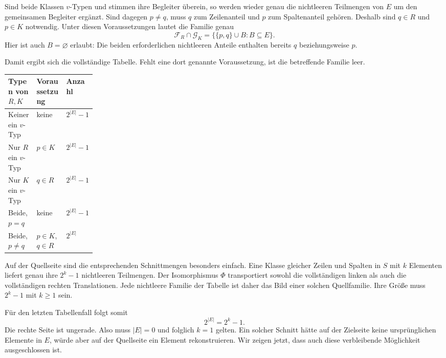 \documentclass[a4paper,11pt]{article}
\theoremstyle{remark}
\begin{document}
Sind beide Klassen $v$-Typen und stimmen ihre Begleiter überein, so
werden wieder genau die nichtleeren Teilmengen von $E$ um den gemeinsamen
Begleiter ergänzt. Sind dagegen $p\ne q$, muss $q$ zum Zeilenanteil und
$p$ zum Spaltenanteil gehören. Deshalb sind $q\in R$ und $p\in K$
notwendig. Unter diesen Voraussetzungen lautet die Familie genau
\begin{equation}
 \mathcal F_R\cap\mathcal G_K
 =\bigl\{\{p,q\}\cup B:B\subseteq E\bigr\}.
 \label{tp:crossing-family}
\end{equation}
Hier ist auch $B=\varnothing$ erlaubt: Die beiden erforderlichen
nichtleeren Anteile enthalten bereits $q$ beziehungsweise $p$.

Damit ergibt sich die vollständige Tabelle. Fehlt eine dort genannte
Voraussetzung, ist die betreffende Familie leer.
\begin{center}
\small
\begin{tabularx}{\linewidth}{@{}
  >{\raggedright\arraybackslash}X
  >{\raggedright\arraybackslash}X
  >{\raggedleft\arraybackslash}p{0.20\linewidth}@{}}
\toprule
Typen von $R,K$ & Voraussetzung & Anzahl \\
\midrule
Keiner ein $v$-Typ & keine & $2^{|E|}-1$ \\
Nur $R$ ein $v$-Typ & $p\in K$ & $2^{|E|}-1$ \\
Nur $K$ ein $v$-Typ & $q\in R$ & $2^{|E|}-1$ \\
Beide, $p=q$ & keine & $2^{|E|}-1$ \\
Beide, $p\ne q$ & $p\in K$, $q\in R$ & $2^{|E|}$ \\
\bottomrule
\end{tabularx}
\end{center}

Auf der Quellseite sind die entsprechenden Schnittmengen besonders
einfach. Eine Klasse gleicher Zeilen und Spalten in $S$ mit $k$ Elementen
liefert genau ihre $2^k-1$ nichtleeren Teilmengen. Der Isomorphismus
$\Phi$ transportiert sowohl die vollständigen linken als auch die
vollständigen rechten Translationen. Jede nichtleere Familie der Tabelle
ist daher das Bild einer solchen Quellfamilie. Ihre Größe muss $2^k-1$
mit $k\ge1$ sein.

Für den letzten Tabellenfall folgt somit
\[
 2^{|E|}=2^k-1.
\]
Die rechte Seite ist ungerade. Also muss $|E|=0$ und folglich $k=1$
gelten. Ein solcher Schnitt hätte auf der Zielseite keine ursprünglichen
Elemente in $E$, würde aber auf der Quellseite ein Element rekonstruieren.
Wir zeigen jetzt, dass auch diese verbleibende Möglichkeit ausgeschlossen
ist.
\end{document}
